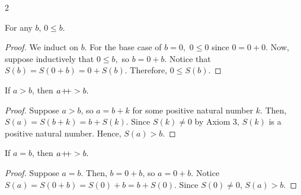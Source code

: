 \begin{multicols}{2}
\begin{proposition}
    For any $b$, $0 \leq b.$
\end{proposition}
\begin{proof}
    We induct on $b$. For the base case of $b = 0,$ $0 \leq 0$ since $0 = 0 + 0.$
    Now, suppose inductively that $0 \leq b,$ so $b = 0 + b.$ 
    Notice that $S(b) = S(0 + b) = 0 + S(b).$
    Therefore, $0 \leq S(b).$
\end{proof}

\begin{proposition}
    If $a > b$, then $a \! +\!\!\!+ > b.$
\end{proposition}
\begin{proof}
    Suppose $a > b$, so $a = b + k$ for some positive natural number $k$.
    Then, $S(a) = S(b + k) = b + S(k)$.
    Since $S(k) \neq 0$ by Axiom 3, $S(k)$ is a positive natural number. 
    Hence, $S(a) > b.$
\end{proof}

\begin{proposition}
    If $a = b$, then $a \! +\!\!\!+ > b.$
\end{proposition}
\begin{proof}
    Suppose $a = b$. 
    Then, $b = 0 + b$, so $a = 0 + b.$  
    Notice $S(a) = S(0 + b) = S(0) + b = b + S(0)$.
    Since $S(0) \neq 0$, $S(a) > b.$
\end{proof}
\end{multicols}


